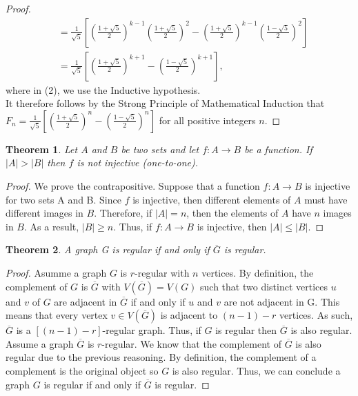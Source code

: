 \documentclass[11pt]{article}
\newtheorem{theorem}{Theorem}
\begin{document}
\begin{proof}
\begin{align}
		&= \frac{1}{\sqrt{5}}\left[\left(\frac{1+\sqrt{5}}{2}\right)^{k-1}\left(\frac{1+\sqrt{5}}{2}\right)^2 - \left(\frac{1+\sqrt{5}}{2}\right)^{k-1}\left(\frac{1-\sqrt{5}}{2}\right)^2\right] \\
		&= \frac{1}{\sqrt{5}}\left[\left(\frac{1+\sqrt{5}}{2}\right)^{k+1}-\left(\frac{1-\sqrt{5}}{2}\right)^{k+1}\right],
	\end{align}
	where in (2), we use the Inductive hypothesis. \\
	It therefore follows by the Strong Principle of Mathematical Induction that $F_n=\frac{1}{\sqrt{5}}\left[\left(\frac{1+\sqrt{5}}{2}\right)^n-\left(\frac{1-\sqrt{5}}{2}\right)^n\right]$ for all positive integers $n$.
\end{proof}

\newpage

\begin{theorem}
	Let $A$ and $B$ be two sets and let $f:A\to B$ be a function.  
	If $|A| > |B|$ then $f$ is not injective (one-to-one).	
\end{theorem}

\begin{proof}
	We prove the contrapositive. Suppose that a function $f:A\to B$ is injective for two sets A and B. Since $f$ is injective, then different elements of $A$ must have different images in $B$. Therefore, if $|A| = n$, then the elements of $A$ have $n$ images in $B$. As a result, $|B|\ge n$. Thus, if $f: A\to B$ is injective, then $|A|\le|B|$.
\end{proof}

\newpage

\begin{theorem}
A graph G is regular if and only if $\overline{G}$ is regular.
\end{theorem}

\begin{proof}
Asumme a graph $G$ is $r$-regular with $n$ vertices. By definition, the complement of $G$ is $\overline{G}$ with $V(\overline{G})=V(G)$ such that two distinct vertices $u$ and $v$ of $G$ are adjacent in $\overline{G}$ if and only if $u$ and $v$ are not adjacent in G. This means that every vertex $v\in V(\overline{G})$ is adjacent to $(n-1)-r$ vertices. As such, $\overline{G}$ is a $[(n-1)-r]$-regular graph. Thus, if $G$ is regular then $\overline{G}$ is also regular. \\

Assume a graph $\overline{G}$ is $r$-regular. We know that the complement of $\overline{G}$ is also regular due to the previous reasoning. By definition, the complement of a complement is the original object so $G$ is also regular. Thus, we can conclude a graph $G$ is regular if and only if $\overline{G}$ is regular.
\end{proof}
\end{document}
